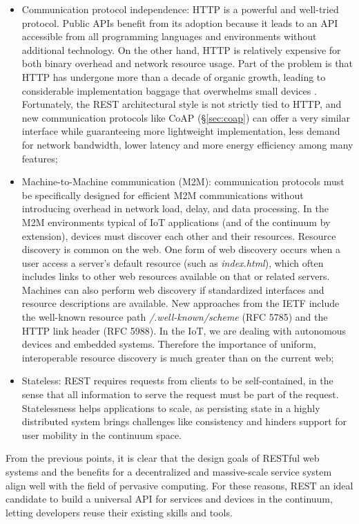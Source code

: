 \begin{itemize}
    \item Communication protocol independence: HTTP is a powerful and well-tried protocol. Public APIs benefit from its adoption because it leads to an API accessible from all programming languages and environments without additional technology. On the other hand, HTTP is relatively expensive for both binary overhead and network resource usage. Part of the problem is that HTTP has undergone more than a decade of organic growth, leading to considerable implementation baggage that overwhelms small devices \cite{bormann2012coap}. Fortunately, the REST architectural style is not strictly tied to HTTP, and new communication protocols like CoAP (§\ref{sec:coap}) can offer a very similar interface while guaranteeing more lightweight implementation, less demand for network bandwidth, lower latency and more energy efficiency among many features;
    \item Machine-to-Machine communication (M2M): communication protocols must be specifically designed for efficient M2M communications without introducing overhead in network load, delay, and data processing. In the M2M environments typical of IoT applications (and of the continuum by extension), devices must discover each other and their resources. Resource discovery is common on the web. One form of web discovery occurs when a user access a server's default resource (such as \emph{index.html}), which often includes links to other web resources available on that or related servers. Machines can also perform web discovery if standardized interfaces and resource descriptions are available. New approaches from the IETF include the well-known resource path \emph{/.well-known/scheme} (RFC 5785) and the HTTP link header (RFC 5988). In the IoT, we are dealing with autonomous devices and embedded systems. Therefore the importance of uniform, interoperable resource discovery is much greater than on the current web;
    \item Stateless: REST requires requests from clients to be self-contained, in the sense that all information to serve the request must be part of the request. Statelessness helps applications to scale, as persisting state in a highly distributed system brings challenges like consistency and hinders support for user mobility in the continuum space.
\end{itemize}

From the previous points, it is clear that the design goals of RESTful web systems and the benefits for a decentralized and massive-scale service system align well with the field of pervasive computing. For these reasons, REST an ideal candidate to build a universal API for services and devices in the continuum, letting developers reuse their existing skills and tools. 

